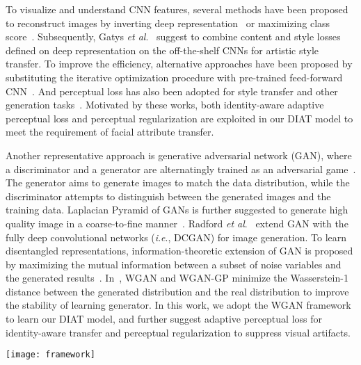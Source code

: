 \documentclass[journal]{IEEEtran}
\newcommand{\etal}{\textit{et al}.}
\newcommand{\ie}{\textit{i}.\textit{e}.}
\begin{document}
To visualize and understand CNN features, several methods have been proposed to reconstruct images by inverting deep representation~\cite{mahendran2015understanding} or maximizing class score~\cite{simonyan2013deep}.
Subsequently, Gatys \etal~\cite{gatys2015style} suggest to combine content and style losses defined on deep representation on the off-the-shelf CNNs for artistic style transfer.
To improve the efficiency, alternative approaches have been proposed by substituting the iterative optimization procedure with pre-trained feed-forward CNN~\cite{johnson2016perceptual, ulyanov2016texture}.
And perceptual loss has also been adopted for style transfer and other generation tasks~\cite{johnson2016perceptual}.
Motivated by these works, both identity-aware adaptive perceptual loss and perceptual regularization are exploited in our DIAT model to meet the requirement of facial attribute transfer.


Another representative approach is generative adversarial network (GAN), where a discriminator and a generator are alternatingly trained as an adversarial game~\cite{goodfellow2014generative}.
The generator aims to generate images to match the data distribution, while the discriminator attempts to distinguish between the generated images and the training data.
Laplacian Pyramid of GANs is further suggested to generate high quality image in a coarse-to-fine manner~\cite{denton2015deep}.
Radford \etal~\cite{radford2015unsupervised} extend GAN with the fully deep convolutional networks (\ie, DCGAN) for image generation.
To learn disentangled representations, information-theoretic extension of GAN is proposed by maximizing the mutual information between a subset of noise variables and the generated results~\cite{chen2016infogan}.
In~\cite{arjovsky2017wasserstein,gulrajani2017improved}, WGAN and WGAN-GP minimize the Wasserstein-1 distance between the generated distribution and the real distribution to improve the stability of learning generator.
In this work, we adopt the WGAN framework to learn our DIAT model, and further suggest adaptive perceptual loss for identity-aware transfer and perceptual regularization to suppress visual artifacts.
\begin{figure*}[t]
\begin{center}
   \texttt{[image: framework]}
\end{center}
   \caption{Schematic illustration of our DIAT model. Here we use \emph{glasses removal} as an example. The whole attribute transfer network $F(\mathbf{x})$ includes two sub-networks, \ie, a mask network to find the attribute relevant region $M(\mathbf{x})$ and an attribute transform network to produce the transformed image $T(\mathbf{x})$. Then $M(\mathbf{x})$ and $T(\mathbf{x})$ collaborate to generate the transfer result $F(\mathbf{x})=M(\mathbf{x}) \circ T(\mathbf{x})+(1-M(\mathbf{x})) \circ \mathbf{x}$. In order to learn $F(\mathbf{x})$ from training data, we incorporate adversarial attribute loss $\ell_{att}$, identity loss $\ell_{id}$, adaptive perceptual loss $\ell_{id\_per}$ with perceptual regularization $\ell_{smooth}$. Besides, an attribute ratio regularization is also adopted to constrain the estimated mask $M(\mathbf{x})$.}
\label{diat_procedure}
\end{figure*}
\end{document}
